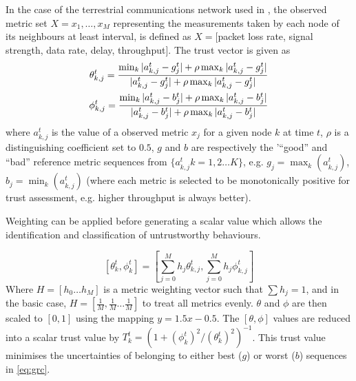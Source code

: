\documentclass[conference]{IEEEtran}
\begin{document}
In the case of the terrestrial communications network used in \cite{Guo11}, the observed metric set $X = {x_1,\dots,x_M}$ representing the measurements taken by each node of its neighbours at least interval, is defined as $X=[$packet loss rate, signal strength, data rate, delay, throughput$]$.
The trust vector is given as
%
\begin{align}
  \label{eq:grc}
  \theta_{k,j}^t = \frac{\min_k|a_{k,j}^t - g_j^t| + \rho \max_k|a_{k,j}^t-g_j^t|}{|a_{k,j}^t-g_j^t| + \rho \max_k|a_{k,j}^t-g_j^t|} \\
  \phi_{k,j}^t = \frac{\min_k|a_{k,j}^t - b_j^t| + \rho \max_k|a_{k,j}^t-b_j^t|}{|a_{k,j}^t-b_j^t| + \rho \max_k|a_{k,j}^t-b_j^t|} \notag 
\end{align}
%
where $a_{k,j}^t$ is the value of a observed metric $x_j$ for a given node $k$ at time $t$, $\rho$ is a distinguishing coefficient set to $0.5$, $g$ and $b$ are respectively the '``good'' and ``bad'' reference metric sequences from $\{a_{k,j}^t k=1,2\dots K\}$, e.g. $g_j=\max_k({a_{k,j}^t})$,  $b_j=\min_k({a_{k,j}^t})$ (where each metric is selected to be monotonically positive for trust assessment, e.g. higher throughput is always better). 

Weighting can be applied before generating a scalar value which allows the identification and classification of untrustworthy behaviours.

%
\begin{equation}
  \label{eq:metric_weighting}
  [\theta_k^t, \phi_k^t] = \left[\sum_{j=0}^M h_j \theta_{k,j}^t,\sum_{j=0}^M h_j \phi_{k,j}^t \right]
\end{equation}
Where $H=[h_0\dots h_M]$ is a metric weighting vector such that $\sum h_j = 1$, and in the basic case, $H=[\frac{1}{M},\frac{1}{M}\dots\frac{1}{M}]$ to treat all metrics evenly.
$\theta$ and $\phi$ are then scaled to $[0,1]$ using the mapping $y = 1.5 x - 0.5$.
The $[\theta,\phi]$ values are reduced into a scalar trust value by $T_k^t = ({1+{(\phi_k^t)^2}/{(\theta_k^t)^2}})^{-1}$.
This trust value minimises the uncertainties of belonging to either best ($g$) or worst ($b$) sequences in \eqref{eq:grc}.
\end{document}
